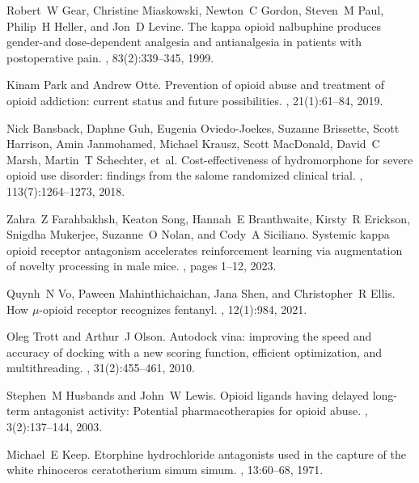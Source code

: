 \documentclass[10pt]{article}
\begin{document}
\begin{thebibliography}{10}
			Robert~W Gear, Christine Miaskowski, Newton~C Gordon, Steven~M Paul, Philip~H
			Heller, and Jon~D Levine.
			\newblock The kappa opioid nalbuphine produces gender-and dose-dependent
			analgesia and antianalgesia in patients with postoperative pain.
			, 83(2):339--345, 1999.
			
			Kinam Park and Andrew Otte.
			\newblock Prevention of opioid abuse and treatment of opioid addiction: current
			status and future possibilities.
			, 21(1):61--84, 2019.
			
			Nick Bansback, Daphne Guh, Eugenia Oviedo-Joekes, Suzanne Brissette, Scott
			Harrison, Amin Janmohamed, Michael Krausz, Scott MacDonald, David~C Marsh,
			Martin~T Schechter, et~al.
			\newblock Cost-effectiveness of hydromorphone for severe opioid use disorder:
			findings from the salome randomized clinical trial.
			, 113(7):1264--1273, 2018.
			
			Zahra~Z Farahbakhsh, Keaton Song, Hannah~E Branthwaite, Kirsty~R Erickson,
			Snigdha Mukerjee, Suzanne~O Nolan, and Cody~A Siciliano.
			\newblock Systemic kappa opioid receptor antagonism accelerates reinforcement
			learning via augmentation of novelty processing in male mice.
			, pages 1--12, 2023.
			
			Quynh~N Vo, Paween Mahinthichaichan, Jana Shen, and Christopher~R Ellis.
			\newblock How $\mu$-opioid receptor recognizes fentanyl.
			, 12(1):984, 2021.
			
			Oleg Trott and Arthur~J Olson.
			\newblock Autodock vina: improving the speed and accuracy of docking with a new
			scoring function, efficient optimization, and multithreading.
			, 31(2):455--461, 2010.
			
			Stephen~M Husbands and John~W Lewis.
			\newblock Opioid ligands having delayed long-term antagonist activity:
			Potential pharmacotherapies for opioid abuse.
			, 3(2):137--144, 2003.
			
			Michael~E Keep.
			\newblock Etorphine hydrochloride antagonists used in the capture of the white
			rhinoceros ceratotherium simum simum.
			, 13:60--68, 1971.
			

\end{thebibliography}
\end{document}
